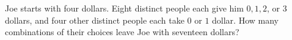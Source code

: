 Joe starts with four dollars. Eight distinct people each give him $0,1,2$, or $3$ dollars, and four other distinct people each take $0$ or $1$ dollar. How many combinations of their choices leave Joe with seventeen dollars?
